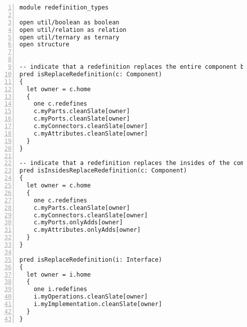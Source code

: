 \lstset{frame=tb, aboveskip=12pt, belowskip=-3pt, breaklines=true, basicstyle=\tiny\ttfamily, tabsize=2, mathescape=true}
\begin{lstlisting}[caption={redefinition\_types.als}, numbers=left]
module redefinition_types

open util/boolean as boolean
open util/relation as relation
open util/ternary as ternary
open structure


-- indicate that a redefinition replaces the entire component by deleting all artefacts
pred isReplaceRedefinition(c: Component)
{
  let owner = c.home
  {
    one c.redefines
    c.myParts.cleanSlate[owner]
    c.myPorts.cleanSlate[owner]
    c.myConnectors.cleanSlate[owner]
    c.myAttributes.cleanSlate[owner]
  }
}

-- indicate that a redefinition replaces the insides of the component by deleting all parts and connectors
pred isInsidesReplaceRedefinition(c: Component)
{
  let owner = c.home
  {
    one c.redefines
    c.myParts.cleanSlate[owner]
    c.myConnectors.cleanSlate[owner]
    c.myPorts.onlyAdds[owner]
    c.myAttributes.onlyAdds[owner]
  }
}

pred isReplaceRedefinition(i: Interface)
{
  let owner = i.home
  {
    one i.redefines
    i.myOperations.cleanSlate[owner]
    i.myImplementation.cleanSlate[owner]
  }
}
\end{lstlisting}